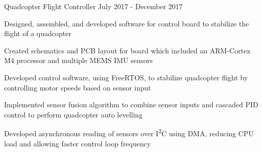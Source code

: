 \begin{cventries}
  \cventry
    {Quadcopter Flight Controller} %
    {} %
    {} %
    {July 2017 - December 2017} %
    {
      \begin{cvitems} %
        \item {Designed, assembled, and developed software for control board to stabilize the flight of a quadcopter}
        \item {Created schematics and PCB layout for board which included an ARM-Cortex M4 processor and multiple MEMS IMU sensors}
        \item {Developed control software, using FreeRTOS, to stabilize quadcopter flight by controlling motor speeds based on sensor input}
        \item {Implemented sensor fusion algorithm to combine sensor inputs and cascaded PID control to perform quadcopter auto levelling}
        \item {Developed asynchronous reading of sensors over I\textsuperscript{2}C using DMA, reducing CPU load and allowing faster control loop frequency}
      \end{cvitems}
    }


\end{cventries}
